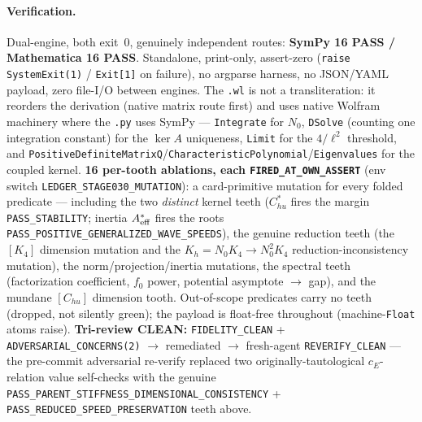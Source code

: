 \paragraph{Verification.}
Dual-engine, both exit~0, genuinely independent routes:
\textbf{SymPy 16 PASS / Mathematica 16 PASS}. Standalone, print-only,
assert-zero (\texttt{raise SystemExit(1)} / \texttt{Exit[1]} on failure), no
argparse harness, no JSON/YAML payload, zero file-I/O between engines. The
\texttt{.wl} is not a transliteration: it reorders the derivation (native matrix
route first) and uses native Wolfram machinery where the \texttt{.py} uses SymPy
--- \texttt{Integrate} for \(N_0\), \texttt{DSolve} (counting one integration
constant) for the \(\ker A\) uniqueness, \texttt{Limit} for the \(4/\ell^2\)
threshold, and \texttt{PositiveDefiniteMatrixQ}/\texttt{CharacteristicPolynomial}/\texttt{Eigenvalues}
for the coupled kernel. \textbf{16 per-tooth ablations, each
\texttt{FIRED\_AT\_OWN\_ASSERT}} (env switch \texttt{LEDGER\_STAGE030\_MUTATION}):
a card-primitive mutation for every folded predicate --- including the two
\emph{distinct} kernel teeth (\(C_{hu}^*\) fires the margin \texttt{PASS\_STABILITY};
inertia \(A_{\rm eff}^*\) fires the roots
\texttt{PASS\_POSITIVE\_GENERALIZED\_WAVE\_SPEEDS}), the genuine reduction teeth
(the \([K_4]\) dimension mutation and the \(K_h=N_0K_4\to N_0^2K_4\)
reduction-inconsistency mutation), the norm/projection/inertia mutations, the
spectral teeth (factorization coefficient, \(f_0\) power, potential asymptote
\(\to\) gap), and the mundane \([C_{hu}]\) dimension tooth. Out-of-scope
predicates carry no teeth (dropped, not silently green); the payload is
float-free throughout (machine-\texttt{Float} atoms raise). \textbf{Tri-review
CLEAN:} \texttt{FIDELITY\_CLEAN} + \texttt{ADVERSARIAL\_CONCERNS(2)} \(\to\)
remediated \(\to\) fresh-agent \texttt{REVERIFY\_CLEAN} --- the pre-commit
adversarial re-verify replaced two originally-tautological \(c_E\)-relation value
self-checks with the genuine
\texttt{PASS\_PARENT\_STIFFNESS\_DIMENSIONAL\_CONSISTENCY} +
\texttt{PASS\_REDUCED\_SPEED\_PRESERVATION} teeth above.
